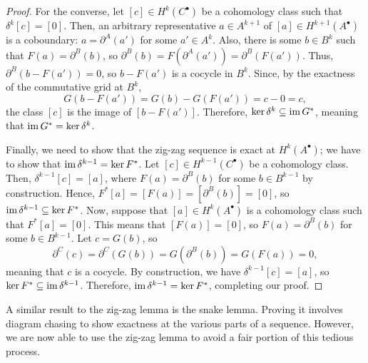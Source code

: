 \documentclass[a4paper,12pt]{article}
\begin{document}
\begin{proof}
    For the converse, let $[c] \in H^k(C^\bullet)$ be a cohomology class such that $\delta^k[c] = [0]$.
    Then, an arbitrary representative $a \in A^{k+1}$ of $[a] \in H^{k+1}(A^\bullet)$ is a coboundary: $a = \partial^A(a')$ for some $a' \in A^k$.
    Also, there is some $b \in B^k$ such that $F(a) = \partial^B(b)$, so $\partial^B(b) = F(\partial^A(a')) = \partial^B(F(a'))$.
    Thus, $\partial^B(b - F(a')) = 0$, so $b - F(a')$ is a cocycle in $B^k$.
    Since, by the exactness of the commutative grid at $B^k$,
    \begin{equation}
        G(b - F(a')) = G(b) - G(F(a')) = c - 0 = c,
    \end{equation}
    the class $[c]$ is the image of $[b - F(a')]$.
    Therefore, $\ker \delta^k \subseteq \operatorname{im} G^*$, meaning that $\operatorname{im} G^* = \ker \delta^k$.

    Finally, we need to show that the zig-zag sequence is exact at $H^k(A^\bullet)$; we have to show that $\operatorname{im} \delta^{k-1} = \ker F^*$.
    Let $[c] \in H^{k-1}(C^\bullet)$ be a cohomology class.
    Then, $\delta^{k-1}[c] = [a]$, where $F(a) = \partial^B(b)$ for some $b \in B^{k-1}$ by construction.
    Hence, $F^*[a] = [F(a)] = [\partial^B(b)] = [0]$, so $\operatorname{im} \delta^{k-1} \subseteq \ker F^*$.
    Now, suppose that $[a] \in H^k(A^\bullet)$ is a cohomology class such that $F^*[a] = [0]$.
    This means that $[F(a)] = [0]$, so $F(a) = \partial^B(b)$ for some $b \in B^{k-1}$.
    Let $c = G(b)$, so 
    \begin{equation}
        \partial^C(c) = \partial^C(G(b)) = G(\partial^B(b)) = G(F(a)) = 0,
    \end{equation}
    meaning that $c$ is a cocycle.
    By construction, we have $\delta^{k-1}[c] = [a]$, so $\ker F^* \subseteq \operatorname{im} \delta^{k-1}$.
    Therefore, $\operatorname{im} \delta^{k-1} = \ker F^*$, completing our proof.
\end{proof}
A similar result to the zig-zag lemma is the snake lemma.
Proving it involves diagram chasing to show exactness at the various parts of a sequence.
However, we are now able to use the zig-zag lemma to avoid a fair portion of this tedious process.
\end{document}
